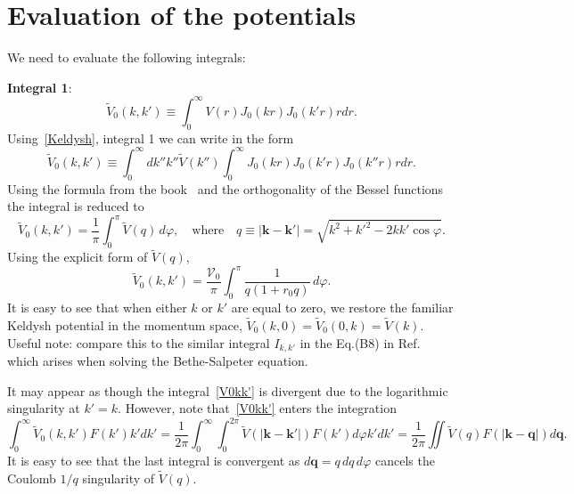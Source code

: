 \documentclass[
aps,
prl,
groupedaddress,
superscriptaddress,
floatfix,
notitlepage
]{revtex4-1}
\begin{document}
\appendix

\section{Evaluation of the potentials}


We need to evaluate the following integrals:
\medskip

{\bf Integral 1}:
$$
\tilde{V}_{0}(k,k') \equiv \int_0^\infty V(r) J_{0}(kr) J_{0}(k'r) r dr.
$$
Using~\eqref{Keldysh}, integral 1 we can write in the form
$$
\tilde{V}_{0}(k,k') \equiv \int_0^\infty dk'' k'' \tilde{V}(k'') \int_0^\infty J_{0}(kr) J_{0}(k'r) J_0(k'' r) r dr.
$$
Using the formula from the book~\cite{Watson-book} and the orthogonality of the Bessel functions the integral is reduced to
\begin{equation}
\tilde{V}_{0}(k,k') = \frac{1}{\pi} \int_0^\pi  \tilde{V}\left(q\right)\, d\varphi,
\quad\text{where}\quad
q\equiv |\mathbf{k}-\mathbf{k}'|=\sqrt{k^2+k'^2-2kk'\cos\varphi}.
\label{V0kk'}
\end{equation}
Using the explicit form of $\tilde{V}(q)$,
\begin{equation*}
\boxed{
\tilde{V}_{0}(k,k') = \frac{\mathcal{V}_0}{\pi} \int_0^\pi  \frac{1}{q(1+r_0 q)}\, d\varphi.
}
\end{equation*}
It is easy to see that when either $k$ or $k'$ are equal to zero, we restore the familiar Keldysh potential in the momentum space, $\tilde{V}_{0}(k,0)= \tilde{V}_{0}(0,k) = \tilde{V}(k)$. Useful note: compare this to the similar integral $I_{k,k'}$ in the Eq.(B8) in Ref.~\cite{Wu-PRB-2015} which arises when solving the Bethe-Salpeter equation.

It may appear as though the integral~\eqref{V0kk'} is divergent due to the logarithmic singularity at $k'=k$. However, note that~\eqref{V0kk'} enters the integration
$$
\int_0^\infty \tilde{V}_{0}(k,k') F(k') k' dk' = 
\frac{1}{2\pi} \int_0^\infty  \int_0^{2\pi} \tilde{V}\left(|\mathbf{k}-\mathbf{k}'|\right) F(k')d\varphi k' dk'
= \frac{1}{2\pi} \iint \tilde{V}(q) F(|\mathbf{k}-\mathbf{q}|) d\mathbf{q}.
$$
It is easy to see that the last integral is convergent as $d\mathbf{q}=q\,dq\,d\varphi$ cancels the Coulomb $1/q$ singularity of $\tilde{V}(q)$. 
\end{document}
